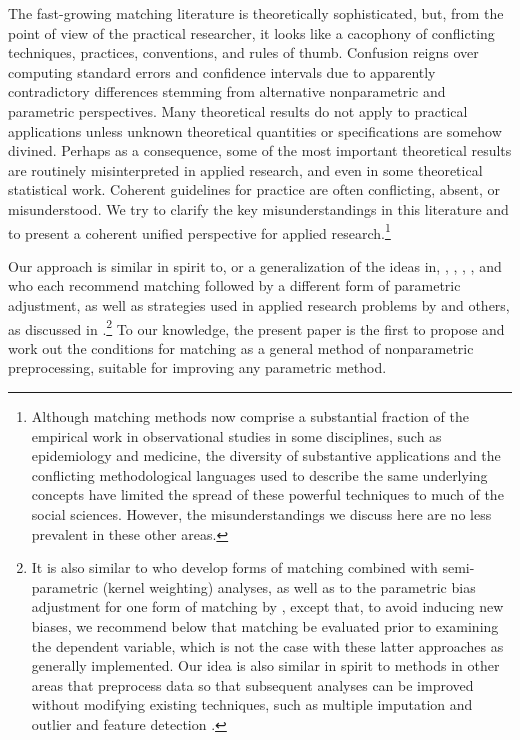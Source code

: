\documentclass[11pt,titlepage]{article}
\begin{document}
The fast-growing matching literature is theoretically sophisticated,
but, from the point of view of the practical researcher, it looks like
a cacophony of conflicting techniques, practices, conventions, and
rules of thumb.  Confusion reigns over computing standard errors and
confidence intervals due to apparently contradictory differences
stemming from alternative nonparametric and parametric perspectives.
Many theoretical results do not apply to practical applications unless
unknown theoretical quantities or specifications are somehow divined.
Perhaps as a consequence, some of the most important theoretical
results are routinely misinterpreted in applied research, and even in
some theoretical statistical work.  Coherent guidelines for practice
are often conflicting, absent, or misunderstood.  We try to clarify
the key misunderstandings in this literature and to present a coherent
unified perspective for applied research.\footnote{Although matching
  methods now comprise a substantial fraction of the empirical work in
  observational studies in some disciplines, such as epidemiology and
  medicine, the diversity of substantive applications and the
  conflicting methodological languages used to describe the same
  underlying concepts have limited the spread of these powerful
  techniques to much of the social sciences.  However, the
  misunderstandings we discuss here are no less prevalent in these
  other areas.}

Our approach is similar in spirit to, or a generalization of the ideas
in, \citet{CocRub73}, \citet{RosRub84a}, \citet{Rubin73b,Rubin79},
\citet{RubTho00}, and \citet{ImaDyk04} who each recommend matching
followed by a different form of parametric adjustment, as well as
strategies used in applied research problems by \citet{Rosenbaum86}
and others, as discussed in \citet{GlaLevMye03}.\footnote{It is also
  similar to \citet{HecIchTod98} who develop forms of matching
  combined with semi-parametric (kernel weighting) analyses, as well
  as to the parametric bias adjustment for one form of matching by
  \citet{AbaImb06}, except that, to avoid inducing new biases, we
  recommend below that matching be evaluated prior to examining the
  dependent variable, which is not the case with these latter
  approaches as generally implemented.  Our idea is also similar in
  spirit to methods in other areas that preprocess data so that
  subsequent analyses can be improved without modifying existing
  techniques, such as multiple imputation \citep{Rubin87,KinHonJos01}
  and outlier and feature detection \citep[][Ch.8]{Bishop95}.}  To our
knowledge, the present paper is the first to propose and work out the
conditions for matching as a general method of nonparametric
preprocessing, suitable for improving any parametric method.
\end{document}
